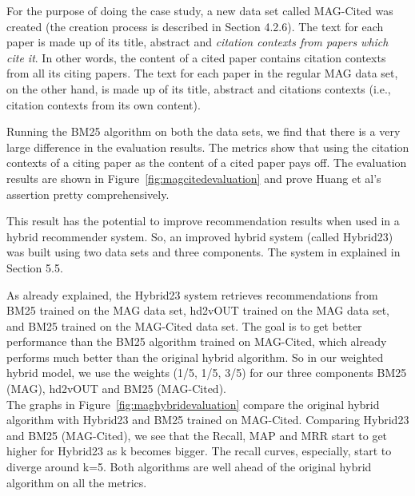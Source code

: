 For the purpose of doing the case study, a new data set called MAG-Cited was created (the creation process is described in Section 4.2.6). The text for each paper is made up of its title, abstract and \textit{citation contexts from papers which cite it}. In other words, the content of a cited paper contains citation contexts from all its citing papers.
The text for each paper in the regular MAG data set, on the other hand, is made up of its title, abstract and citations contexts (i.e., citation contexts from its own content). 

Running the BM25 algorithm on both the data sets, we find that there is a very large difference in the evaluation results. The metrics show that using the citation contexts of a citing paper as the content of a cited paper pays off. The evaluation results are shown in Figure~\ref{fig:magcitedevaluation} and prove Huang et al's assertion pretty comprehensively. 

This result has the potential to improve recommendation results when used in a hybrid recommender system. So, an improved hybrid system (called Hybrid23) was built using two data sets and three components. The system in explained in Section 5.5.

As already explained, the Hybrid23 system retrieves recommendations from BM25 trained on the MAG data set, hd2vOUT trained on the MAG data set, and BM25 trained on the MAG-Cited data set. The goal is to get better performance than the BM25 algorithm trained on MAG-Cited, which already performs much better than the original hybrid algorithm. So in our weighted hybrid model, we use the weights (1/5, 1/5, 3/5) for our three components BM25 (MAG), hd2vOUT and BM25 (MAG-Cited). \\
The graphs in Figure~\ref{fig:maghybridevaluation} compare the original hybrid algorithm with Hybrid23 and BM25 trained on MAG-Cited. Comparing Hybrid23 and BM25 (MAG-Cited), we see that the Recall, MAP and MRR start to get higher for Hybrid23 as k becomes bigger. The recall curves, especially, start to diverge around k=5. Both algorithms are well ahead of the original hybrid algorithm on all the metrics. 

